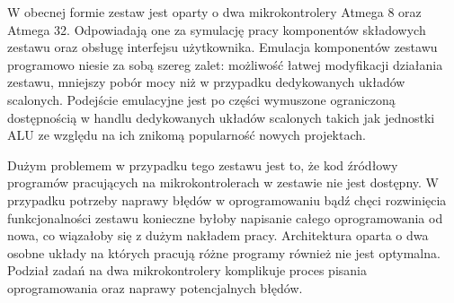 \documentclass[../main.tex]{subfiles}
\begin{document}
    W obecnej formie zestaw jest oparty o dwa mikrokontrolery Atmega 8 oraz Atmega 32. Odpowiadają one za symulację pracy komponentów składowych zestawu
    oraz obsługę interfejsu użytkownika. Emulacja komponentów zestawu programowo niesie za sobą szereg zalet: możliwość łatwej modyfikacji
    działania zestawu, mniejszy pobór mocy niż w przypadku dedykowanych układów scalonych. Podejście emulacyjne jest po części wymuszone 
    ograniczoną dostępnością w handlu dedykowanych układów scalonych takich jak jednostki ALU ze względu na ich znikomą popularność nowych projektach.
    \par
    Dużym problemem w przypadku tego zestawu jest to, że kod źródłowy programów pracujących na mikrokontrolerach w zestawie nie jest dostępny. 
    W przypadku potrzeby naprawy błędów w oprogramowaniu bądź chęci rozwinięcia funkcjonalności zestawu konieczne byłoby napisanie
    całego oprogramowania od nowa, co wiązałoby się z dużym nakładem pracy. Architektura oparta o dwa osobne układy na 
    których pracują różne programy również nie jest optymalna. Podział zadań na dwa mikrokontrolery komplikuje proces pisania oprogramowania oraz
    naprawy potencjalnych błędów.
\end{document}
